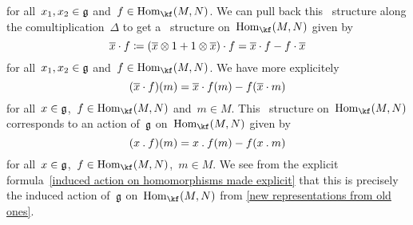 \begin{remark}
\begin{enumerate}
\[			\]
			for all~$x_1, x_2 \in \mathfrak{g}$ and~$f \in \Hom_{\kf}(M,N)$.
			We can pull back this~\module{$\Univ(\glie) \tensor \Univ(\glie)$} structure along the comultiplication~$\Delta$ to get a~\module{$\Univ(\glie)$} structure on~$\Hom_{\kf}(M,N)$ given by
			\[
				\overline{x} \cdot f
				\coloneqq
				(\overline{x} \otimes 1 + 1 \otimes \overline{x}) \cdot f
				=
				\overline{x} \cdot f - f \cdot \overline{x}
			\]
			for all~$x_1, x_2 \in \mathfrak{g}$ and~$f \in \Hom_{\kf}(M,N)$.
			We have more explicitely
			\[
				(\overline{x} \cdot f)(m)
				=
				\overline{x} \cdot f(m) - f(\overline{x} \cdot m)
			\]
			for all~$x \in \mathfrak{g}$,~$f \in \Hom_{\kf}(M,N)$ and~$m \in M$.
			This~\module{$\Univ(\glie)$} structure on~$\Hom_{\kf}(M,N)$ corresponds to an action of~$\mathfrak{g}$ on~$\Hom_{\kf}(M,N)$ given by
			\begin{equation}
				\label{induced action on homomorphisms made explicit}
				(x \mathbin{.} f)(m)
				=
				x \mathbin{.} f(m) - f(x \mathbin{.} m)
			\end{equation}
			for all~$x \in \mathfrak{g}$,~$f \in \Hom_{\kf}(M,N)$,~$m \in M$.
			We see from the explicit formula~\eqref{induced action on homomorphisms made explicit} that this is precisely the induced action of~$\mathfrak{g}$ on~$\Hom_{\kf}(M,N)$ from \cref{new representations from old ones}.
	\end{enumerate}
\end{remark}


